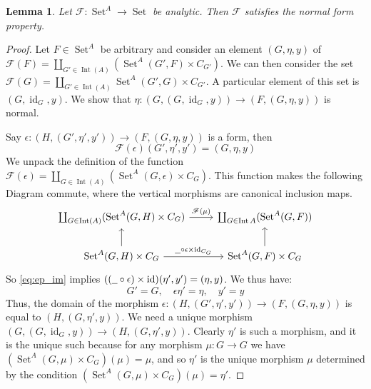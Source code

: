 \documentclass[12pt]{article}
\theoremstyle{plain}
\newtheorem{lemma}[thm]{Lemma}
\theoremstyle{definition}
\newcommand{\scr}[1]{\mathscr{#1}}
\newcommand{\und}[1]{\underline{\hspace{#1 cm}}}
\newcommand{\lto}{\longrightarrow}
\DeclareMathOperator{\set}{Set}
\begin{document}
	\begin{lemma}\label{lem:analytic--->normal_form_property}
		Let $\scr{F}: \set^A \lto \set$ be analytic. Then $\scr{F}$ satisfies the normal form property.
		\end{lemma}
	\begin{proof}
		Let $F \in \set^A$ be arbitrary and consider an element $(G, \eta, y)$ of $\scr{F}(F) = \coprod_{G' \in \operatorname{Int}(A)}(\set^A(G', F) \times C_{G'})$. We can then consider the set $\scr{F}(G) = \coprod_{G' \in \operatorname{Int}(A)}\set^A(G', G) \times C_{G'}$. A particular element of this set is $(G, \operatorname{id}_G, y)$. We show that $\eta: (G, (G, \operatorname{id}_G, y)) \lto (F, (G, \eta, y))$ is normal.
		
		Say $\epsilon: (H, (G', \eta', y')) \lto (F, (G,\eta, y))$ is a form, then
		\begin{equation}\label{eq:ep_im}
			\scr{F}(\epsilon)(G', \eta', y') = (G, \eta, y)
			\end{equation}
		We unpack the definition of the function $\scr{F}(\epsilon) = \coprod_{G \in \operatorname{Int}(A)}(\set^A(G,\epsilon) \times C_G)$. This function makes the following Diagram commute, where the vertical morphisms are canonical inclusion maps.
		\begin{equation}
			\begin{tikzcd}
				\coprod_{G \in \operatorname{Int}(A)}(\set^A(G, H) \times C_G)\arrow[r,"{\scr{F}(\mu)}"] & \coprod_{G \in \operatorname{Int}A}(\set^A(G, F))\\
				\set^A(G, H) \times C_G\arrow[r,"{\und{0.2} \circ \epsilon \times \operatorname{id}_{C_G}}"]\arrow[u] & \set^A(G, F) \times C_G\arrow[u]
				\end{tikzcd}
			\end{equation}
		So \eqref{eq:ep_im} implies $((\und{0.2} \circ \epsilon) \times \operatorname{id})(\eta', y') = (\eta, y)$. We thus have:
		\begin{equation}
				G' = G,\quad \epsilon \eta' = \eta,\quad y' = y
			\end{equation}
		Thus, the domain of the morphism $\epsilon: (H, (G', \eta', y')) \lto (F, (G, \eta, y))$ is equal to $(H, (G, \eta', y))$. We need a unique morphism $(G, (G, \operatorname{id}_G, y)) \lto (H, (G, \eta', y))$. Clearly $\eta'$ is such a morphism, and it is the unique such because for any morphism $\mu: G \lto G$ we have $(\set^A(G, \mu) \times C_G)(\mu) = \mu$,  and so $\eta'$ is the unique morphism $\mu$ determined by the condition $(\set^A(G, \mu) \times C_G)(\mu) = \eta'$.
		\end{proof}
\end{document}
